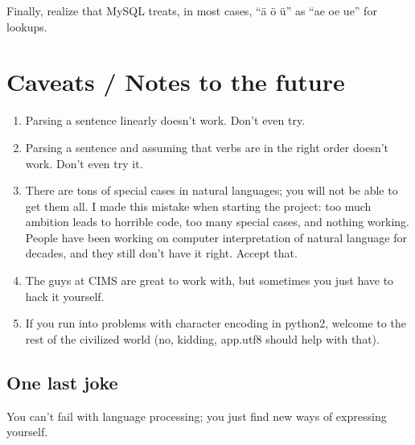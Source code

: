 \documentclass[12pt]{article}
\begin{document}
Finally, realize that MySQL treats, in most cases, ``\"{a} \"{o} \"{u}'' as ``ae oe ue'' for lookups.

\section{Caveats / Notes to the future}

\begin{enumerate}

\item Parsing a sentence linearly doesn't work.  Don't even try.
\item Parsing a sentence and assuming that verbs are in the right order doesn't work.  Don't even try it.
\item There are tons of special cases in natural languages; you will not be able to get them all.  I
	made this mistake when starting the project: too much ambition leads to horrible code, too
	many special cases, and nothing working.  People have been working on computer interpretation
	of natural language for decades, and they still don't have it right.  Accept that.
\item The guys at CIMS are great to work with, but sometimes you just have to hack it yourself.
\item If you run into problems with character encoding in python2, welcome to the rest of the civilized
	world (no, kidding, app.utf8 should help with that).

\end{enumerate}

\subsection{One last joke}

You can't fail with language processing; you just find new ways of expressing yourself.
\end{document}
